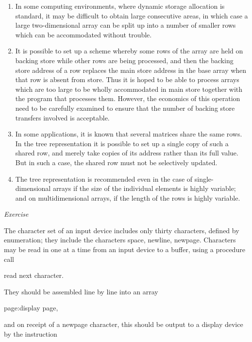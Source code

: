 \begin{enumerate}[wide, nosep, label=(\arabic*)]
	\item In some computing environments, where dynamic storage allocation is standard, it may be difficult to obtain large consecutive areas, in which case a large two-dimensional array can be split up into a number of smaller rows which can be accommodated without trouble.

	\item It is possible to set up a scheme whereby some rows of the array are held on backing store while other rows are being processed, and then the backing store address of a row replaces the main store address in the base array when that row is absent from store. Thus it is hoped to be able to process arrays which are too large to be wholly accommodated in main store together with the program that processes them. However, the economics of this operation need to be carefully examined to ensure that the number of backing store transfers involved is acceptable.

	\item In some applications, it is known that several matrices share the same rows. In the tree representation it is possible to set up a single copy of such a shared row, and merely take copies of its address rather than its full value. But in such a case, the shared row must not be selectively updated.

	\item The tree representation is recommended even in the case of single-dimensional arrays if the size of the individual elements is highly variable; and on multidimensional arrays, if the length of the rows is highly variable.
\end{enumerate}

\noindent
\textit{Exercise}
\nopagebreak

\noindent
The character set of an input device includes only thirty characters, defined by enumeration; they include the characters space, newline, newpage. Characters may be read in one at a time from an input device to a buffer, using a procedure call

\quad read next character.

\noindent
They should be assembled line by line into an array

\quad page:display page,

\noindent
and on receipt of a newpage character, this should be output to a display device by the instruction

